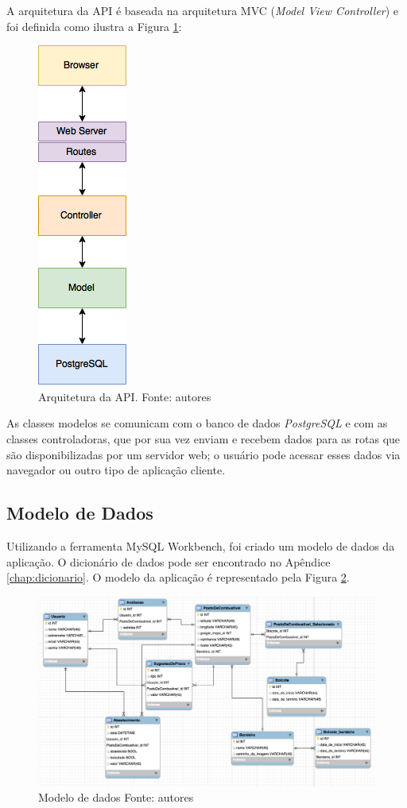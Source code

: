 A arquitetura da API é baseada na arquitetura MVC (\textit{Model View Controller}) e foi definida como ilustra a Figura \ref{img:arquitetura}:

\begin{figure}[H]
    \centering
    \includegraphics[scale=0.5]{figuras/api_arch.png}
    \caption[Arquitetura da API]{Arquitetura da API. Fonte: autores}
    \label{img:arquitetura}
\end{figure}

As classes modelos se comunicam com o banco de dados \textit{PostgreSQL} e com as classes controladoras, que por sua vez enviam e recebem dados para as rotas que são disponibilizadas por um servidor web; o usuário pode acessar esses dados via navegador ou outro tipo de aplicação cliente.

\subsection{Modelo de Dados}

Utilizando a ferramenta MySQL Workbench, foi criado um modelo de dados da aplicação. O dicionário de dados pode ser encontrado no Apêndice \ref{chap:dicionario}. O modelo da aplicação é representado pela Figura \ref{img:modelo_de_dados}.

\begin{figure}[H]
    \centering
    \includegraphics[scale=0.5]{figuras/modelagem_traduzida.png}
    \caption[Modelo de dados]{Modelo de dados Fonte: autores}
    \label{img:modelo_de_dados}
\end{figure}
